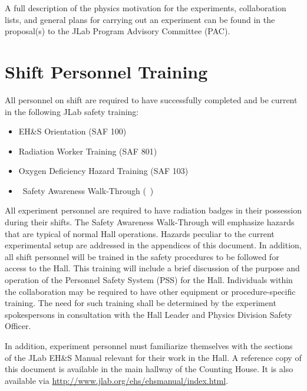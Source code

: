 \documentclass[11pt]{article}
\begin{document}
A full description of the physics motivation for the experiments, collaboration 
lists, and general plans for carrying out an experiment can be found in the
proposal(s) to the JLab Program Advisory Committee (PAC). 

\section{Shift Personnel Training}
\indent

All personnel on shift are required to have successfully completed and be 
current in the following JLab safety training:

\begin{itemize}

\item EH\&S Orientation (SAF 100) 

\item Radiation Worker Training (SAF 801) 

\item Oxygen Deficiency Hazard Training (SAF 103) 

\item \HALL\ Safety Awareness Walk-Through (\AWARENESS\ )

\end{itemize}

 All experiment personnel are 
required to have radiation badges in their possession during their shifts. 
The Safety Awareness Walk-Through will
emphasize hazards that are typical of normal Hall operations.
Hazards  peculiar to the current experimental setup are addressed in the appendices 
of this document. 
In addition, all shift personnel will be trained in the safety procedures to be
followed for access to the Hall. This
training will include a brief discussion of the purpose and operation of the
Personnel Safety System (PSS) for the Hall. 
Individuals within the collaboration may be required to have other equipment 
or procedure-specific training. The need for such
training shall be determined by the experiment spokespersons in consultation 
with the Hall Leader and Physics Division Safety Officer.

In addition, experiment personnel must familiarize themselves with the 
sections of the JLab EH\&S Manual relevant for their work in the Hall. 
A reference copy of this
document is available in the main hallway of the Counting House. It is also
available via \url{http://www.jlab.org/ehs/ehsmanual/index.html}.
\end{document}
